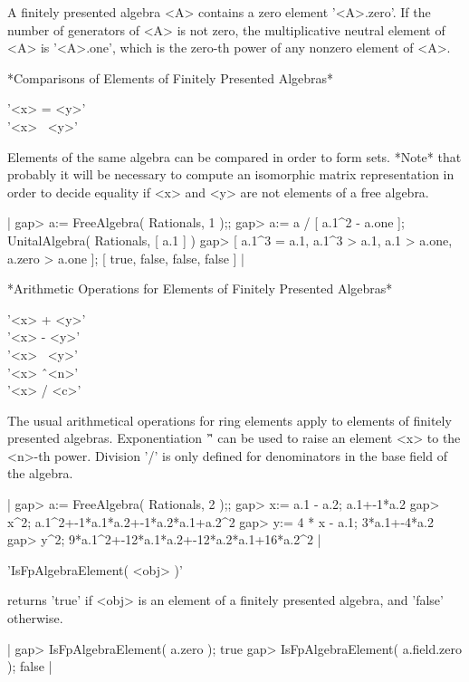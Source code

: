 A finitely presented algebra <A> contains a zero element '<A>.zero'.
If the number of generators of <A> is not zero, the multiplicative neutral
element of <A> is '<A>.one', which is the zero-th power of any nonzero
element of <A>.

\vspace{5mm}

*Comparisons of Elements of Finitely Presented Algebras*

'<x> = <y>'\\
'<x> \<\ <y>'

Elements of the same algebra can be compared in order to form sets.
*Note* that probably it will be necessary to compute an isomorphic
matrix representation in order to decide equality if <x> and <y> are
not elements of a free algebra.

|    gap> a:= FreeAlgebra( Rationals, 1 );;
    gap> a:= a / [ a.1^2 - a.one ];
    UnitalAlgebra( Rationals, [ a.1 ] )
    gap> [ a.1^3 = a.1, a.1^3 > a.1, a.1 > a.one, a.zero > a.one ];
    [ true, false, false, false ] |

\vspace{5mm}

*Arithmetic Operations for Elements of Finitely Presented Algebras*

'<x> + <y>'\\
'<x> - <y>'\\
'<x> \*\ <y>'\\
'<x> \^\ <n>' \\
'<x> / <c>'

The usual arithmetical operations for ring elements apply to elements of
finitely presented algebras.  Exponentiation '\^' can be used to raise
an element <x> to the <n>-th power.  Division '/' is only defined for
denominators in the base field of the algebra.

|    gap> a:= FreeAlgebra( Rationals, 2 );;
    gap> x:= a.1 - a.2;
    a.1+-1*a.2
    gap> x^2;
    a.1^2+-1*a.1*a.2+-1*a.2*a.1+a.2^2
    gap> y:= 4 * x - a.1;
    3*a.1+-4*a.2
    gap> y^2;
    9*a.1^2+-12*a.1*a.2+-12*a.2*a.1+16*a.2^2 |

\vspace{5mm}

'IsFpAlgebraElement( <obj> )'

returns 'true' if <obj> is an element of a finitely presented algebra,
and 'false' otherwise.

|    gap> IsFpAlgebraElement( a.zero );
    true
    gap> IsFpAlgebraElement( a.field.zero );
    false |


